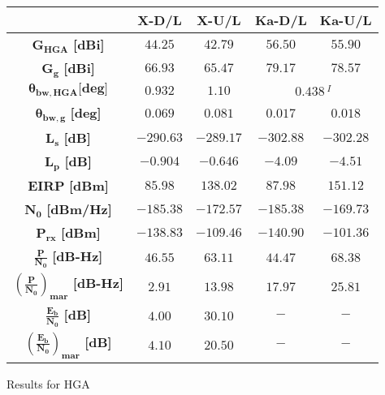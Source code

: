 \begin{minipage}{0.5\linewidth}
    \centering
    \captionsetup{type=table}
    \renewcommand{\arraystretch}{2}
    \setlength\extrarowheight{-1pt}
    \begin{tabular}{|c|c|c|c|c|}
        \hline
        & \textbf{X-D/L} & \textbf{X-U/L} & \textbf{Ka-D/L}& \textbf{Ka-U/L} \\
        \hline
        $\boldsymbol{G_{HGA}}$ \textbf{[dBi]} & $44.25$ & $42.79$ & $56.50$ & $55.90$ \\
        \hline
        $\boldsymbol{G_g}$ \textbf{[dBi]} & $66.93$ & $65.47$ & $79.17$ & $78.57$ \\
        \hline
        $\boldsymbol{\theta_{bw,HGA}} \textbf{[deg]}$  & $0.932$ & $1.10$ &\multicolumn{2}{c|}{$0.438 \,^{I}$}\\
        \hline
        $\boldsymbol{\theta_{bw,g}}$ \textbf{[deg]} & $0.069$ & $0.081$ & $0.017$ & $0.018$ \\
        \hline
        $\boldsymbol{L_{s}}$ \textbf{[dB]} & $-290.63$ & $-289.17$ & $-302.88$ & $-302.28$ \\
        \hline
        $\boldsymbol{L_{p}}$ \textbf{[dB]} & $-0.904$ & $-0.646$ & $-4.09$ & $-4.51$ \\
        \hline
        $\boldsymbol{EIRP}$ \textbf{[dBm]} & $85.98$ & $138.02$ & $87.98$ & $151.12$ \\
        \hline
        $\boldsymbol{N_{0}}$ \textbf{[dBm/Hz]} & $-185.38$ & $-172.57$ & $-185.38$ & $-169.73$ \\
        \hline
        $\boldsymbol{P_{rx}}$ \textbf{[dBm]} & $-138.83$ & $-109.46$ & $-140.90$ & $-101.36$ \\
        \hline
        $\boldsymbol{\frac{P}{N_0}}$ \textbf{[dB-Hz]} & $46.55$ & $63.11$ & $44.47$ & $68.38$ \\
        \hline
        $\boldsymbol{\left(\frac{P}{N_0}\right)_{mar}}$ \textbf{[dB-Hz]} & $2.91$ & $13.98$ & $17.97$ & $25.81$ \\
        \hline
        $\boldsymbol{\frac{E_b}{N_0}}$ \textbf{[dB]} & $4.00$ & $30.10$ & $-$ & $-$ \\
        \hline
        $\boldsymbol{\left(\frac{E_b}{N_0}\right)_{mar}}$ \textbf{[dB]} & $4.10$ & $20.50$ & $-$ & $-$ \\
        \hline
    \end{tabular}
    \caption{Results for HGA}
    \label{table:results_HGA}
\end{minipage}

